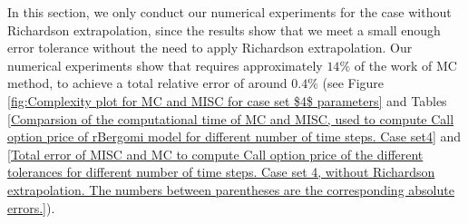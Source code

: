In this section, we only conduct our numerical experiments for the case without Richardson extrapolation, since the results show that we meet a small enough error tolerance without the need to apply   Richardson extrapolation.  Our numerical experiments show that  requires  approximately $14\%$ of the work of MC method, to achieve a total relative error of around $0.4\%$ (see Figure \ref{fig:Complexity plot for MC and MISC for case set $4$ parameters} and Tables \ref{Comparsion of the computational time of  MC and MISC, used to compute Call option price of rBergomi model for different number of time steps. Case set4} and \ref{Total error of MISC and MC to compute Call option price of the different tolerances for different number of time steps. Case set 4, without Richardson extrapolation. The numbers between parentheses are the corresponding absolute errors.}). 

